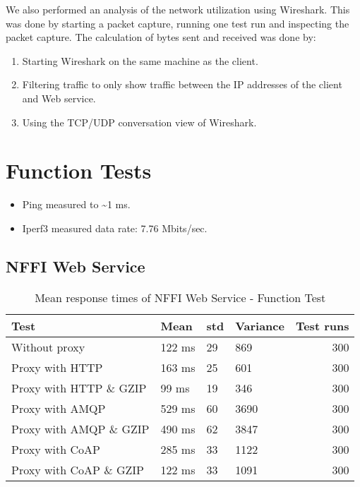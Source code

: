 \begin{appendices}



We also performed an analysis of the network utilization using Wireshark. This was done by starting a packet capture, running one test run and inspecting the packet capture. The calculation of bytes sent and received was done by:

\begin{enumerate}
    \item Starting Wireshark on the same machine as the client.
    \item Filtering traffic to only show traffic between the IP addresses of the client and Web service.
    \item Using the TCP/UDP conversation view of Wireshark.
\end{enumerate}

\section{Function Tests}

\begin{itemize}
	\item Ping measured to \textasciitilde 1 ms.
	\item Iperf3 measured data rate: 7.76 Mbits/sec.
\end{itemize}


\subsection{NFFI Web Service}

\begin{table}[H]
\begin{tabular}{llllr}
\hline
 Test                   &   Mean &   \gls{std} &   Variance &   Test runs \\
\hline
  Without proxy & 122 ms & 29 & 869 & 300 \\
  Proxy with HTTP & 163 ms & 25 & 601 & 300 \\
  Proxy with HTTP \& GZIP & 99 ms & 19 & 346 & 300 \\
  Proxy with AMQP & 529 ms & 60 & 3690 & 300 \\
  Proxy with AMQP \& GZIP & 490 ms & 62 & 3847 & 300\\
  Proxy with CoAP & 285 ms & 33 & 1122 & 300 \\
  Proxy with CoAP \& GZIP & 122 ms & 33 & 1091 & 300 \\
\end{tabular}
\caption{Mean response times of NFFI Web Service - Function Test}
\end{table}


\end{appendices}
